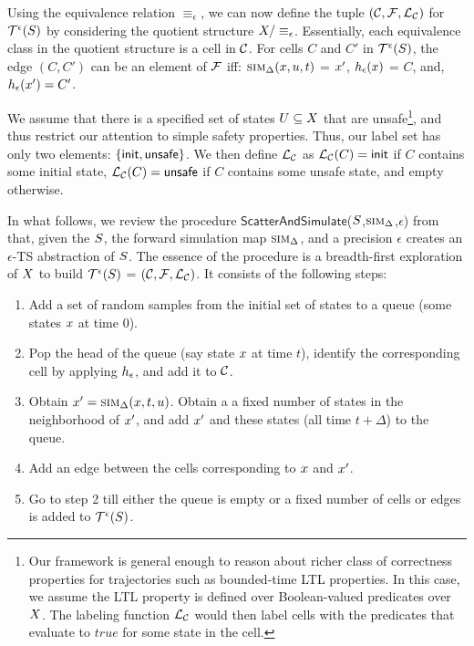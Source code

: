 Using the equivalence relation $\equiv_\epsilon$, we can now define
the tuple $(\mathcal{C}, \mathcal{F}, \mathcal{L}_\mathcal{C})$ for
$\mathcal{T}^{\epsilon}(S)$ by considering the quotient
structure $X/\equiv_\epsilon$.  Essentially, each
equivalence class in the quotient structure is a cell in $\mathcal{C}$.
For cells $C$ and $C'$ in $\mathcal{T}^{\epsilon}(S)$, the
edge $(C,C')$ can be an element of $\mathcal{F}$ iff:
$\mbox{\sc sim}_\Delta(x, u, t)$ = $x'$,
$h_\epsilon(x)$ = $C$, and,
$h_\epsilon(x') = C'$.

We assume that there is a specified set of states $U
\subseteq X$ that are unsafe\footnote{Our framework is
general enough to reason about richer class of correctness properties
for trajectories such as bounded-time LTL properties. In this case, we
assume the LTL property is defined over Boolean-valued predicates over
$X$. The labeling function $\mathcal{L}_\mathcal{C}$ would
then label cells with the predicates that evaluate to $\mathit{true}$
for some state in the cell.}, and thus restrict our attention to
simple safety properties. Thus, our label set has only two elements:
$\{\mathsf{init},\mathsf{unsafe}\}$. We then define $\mathcal{L}_\mathcal{C}$ as
$\mathcal{L}_\mathcal{C}(C) = \mathsf{init}$ if $C$ contains some initial state,
$\mathcal{L}_\mathcal{C}(C) = \mathsf{unsafe}$ if $C$ contains some unsafe
state, and empty otherwise.

In what follows, we review the procedure
$\mathsf{ScatterAndSimulate}$($S$,$\mbox{\sc sim}_\Delta$,$\epsilon$)
from \cite{zutshi2014multiple} that, given the $S$, the forward
simulation map $\mbox{\sc sim}_\Delta$, and a precision $\epsilon$ creates an
$\epsilon$-TS abstraction of $S$.  The
essence of the procedure is a breadth-first exploration of
$X$ to build $\mathcal{T}^{\epsilon}(S)$ =
$(\mathcal{C},\mathcal{F},\mathcal{L}_\mathcal{C})$. It consists of the
following steps:
\begin{enumerate}[leftmargin=1em,labelsep=1em,label={\arabic*.}]
\item
Add a set of random samples from the initial set of states to a queue
(\ie some states $x$ at time $0$).
\item
Pop the head of the queue (say state $x$ at time $t$), identify
the corresponding cell by applying $h_\epsilon$, and add it to
$\mathcal{C}$.
\item
Obtain $x' = \mbox{\sc sim}_\Delta(x, t, u)$. Obtain a a
fixed number of states in the neighborhood of $x'$, and add
$x'$ and these states (all time $t+\Delta$) to the queue.
\item
Add an edge between the cells corresponding to $x$ and
$x'$.
\item
Go to step 2 till either the queue is empty or a fixed number of cells
or edges is added to $\mathcal{T}^{\epsilon}(S)$.
\end{enumerate}

